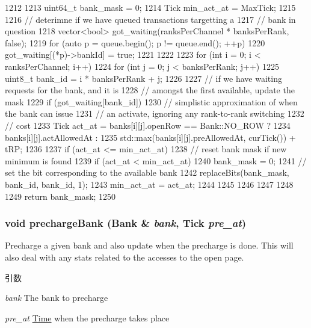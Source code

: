 \begin{DoxyCode}
1212 {
1213     uint64_t bank_mask = 0;
1214     Tick min_act_at = MaxTick;
1215 
1216     // deterimne if we have queued transactions targetting a
1217     // bank in question
1218     vector<bool> got_waiting(ranksPerChannel * banksPerRank, false);
1219     for (auto p = queue.begin(); p != queue.end(); ++p) {
1220         got_waiting[(*p)->bankId] = true;
1221     }
1222 
1223     for (int i = 0; i < ranksPerChannel; i++) {
1224         for (int j = 0; j < banksPerRank; j++) {
1225             uint8_t bank_id = i * banksPerRank + j;
1226 
1227             // if we have waiting requests for the bank, and it is
1228             // amongst the first available, update the mask
1229             if (got_waiting[bank_id]) {
1230                 // simplistic approximation of when the bank can issue
1231                 // an activate, ignoring any rank-to-rank switching
1232                 // cost
1233                 Tick act_at = banks[i][j].openRow == Bank::NO_ROW ?
1234                     banks[i][j].actAllowedAt :
1235                     std::max(banks[i][j].preAllowedAt, curTick()) + tRP;
1236 
1237                 if (act_at <= min_act_at) {
1238                     // reset bank mask if new minimum is found
1239                     if (act_at < min_act_at)
1240                         bank_mask = 0;
1241                     // set the bit corresponding to the available bank
1242                     replaceBits(bank_mask, bank_id, bank_id, 1);
1243                     min_act_at = act_at;
1244                 }
1245             }
1246         }
1247     }
1248 
1249     return bank_mask;
1250 }
\end{DoxyCode}
\hypertarget{classDRAMCtrl_ae75715461eec20eff07a532c11c3d54c}{
\subsubsection[{prechargeBank}]{\setlength{\rightskip}{0pt plus 5cm}void prechargeBank ({\bf Bank} \& {\em bank}, \/  {\bf Tick} {\em pre\_\-at})}}
\label{classDRAMCtrl_ae75715461eec20eff07a532c11c3d54c}
Precharge a given bank and also update when the precharge is done. This will also deal with any stats related to the accesses to the open page.


\begin{DoxyParams}{引数}
\item[{\em bank}]The bank to precharge \item[{\em pre\_\-at}]\hyperlink{classTime}{Time} when the precharge takes place \end{DoxyParams}



